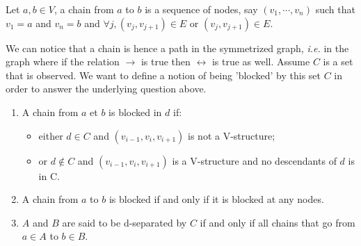 \documentclass[12pt]{report}
\begin{document}
\begin{definition}
Let $a,b\in V$, a chain from $a$ to $b$ is a sequence of nodes, say $(v_1, \cdots, v_n)$ such that $v_1 = a$ and $v_n = b$ and $\forall j, (v_j, v_{j+1}) \in E$ or $(v_j, v_{j+1}) \in E$.
\end{definition}

We can notice that a chain is hence a path in the symmetrized graph, \emph{i.e.} in the graph where if the relation $\rightarrow$ is true then $\leftrightarrow$ is true as well. Assume $C$ is a set that is observed. We want to define a notion of being 'blocked' by this set $C$ in order to answer the underlying question above. 

\begin{definition}
\begin{enumerate}
\item A chain from $a$ et $b$ is blocked in $d$ if:
\begin{itemize}
\item either $d\in C$ and $(v_{i-1}, v_i, v_{i+1})$ is not a V-structure;
\item or $d\notin C$ and $(v_{i-1}, v_i, v_{i+1})$ is a V-structure and no descendants of $d$ is in C.
\end{itemize}

\item A chain from $a$ to $b$ is blocked if and only if it is blocked at any nodes.

\item $A$ and $B$ are said to be d-separated by $C$ if and only if all chains that go from $a\in A$ to $b\in B$.
\end{enumerate}
\end{definition}
\end{document}
